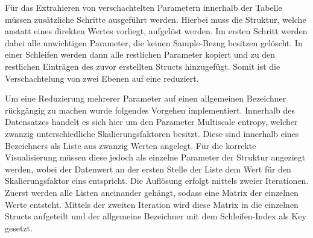 

Für das Extrahieren von verschachtelten Parametern innerhalb der Tabelle müssen zusätzliche Schritte ausgeführt werden. Hierbei muss die Struktur, welche anstatt eines direkten Wertes vorliegt, aufgelöst werden. Im ersten Schritt werden dabei alle unwichtigen Parameter, die keinen Sample-Bezug besitzen gelöscht. In einer Schleifen werden dann alle restlichen Parameter kopiert und zu den restlichen Einträgen des zuvor erstellten Structs hinzugefügt. Somit ist die Verschachtelung von zwei Ebenen auf eine reduziert.



Um eine Reduzierung mehrerer Parameter auf einen allgemeinen Bezeichner rückgängig zu machen wurde folgendes Vorgehen implementiert. Innerhalb des Datensatzes handelt es sich hier um den Parameter \glqq Multiscale entropy\grqq{}, welcher zwanzig unterschiedliche Skalierungsfaktoren besitzt. Diese sind innerhalb eines Bezeichners als Liste aus zwanzig Werten angelegt. Für die korrekte Visualisierung müssen diese jedoch als einzelne Parameter der Struktur angeziegt werden, wobei der Datenwert an der ersten Stelle der Liste dem Wert für den Skalierungsfaktor eins entspricht. Die Auflösung erfolgt mittels zweier Iterationen. Zuerst werden alle Listen aneinander gehängt, sodass eine Matrix der einzelnen Werte entsteht. Mittels der zweiten Iteration wird diese Matrix in die einzelnen Structs aufgeteilt und der allgemeine Bezeichner mit dem Schleifen-Index als Key gesetzt.



